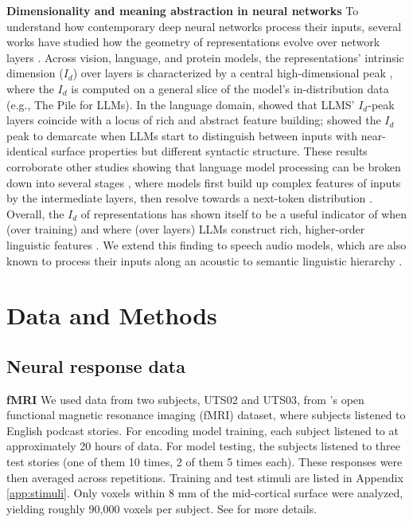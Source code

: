 \documentclass{article}
\theoremstyle{plain}
\theoremstyle{definition}
\theoremstyle{remark}
\newcommand{\mypar}[1]{\textbf{#1}\quad}
\begin{document}
\mypar{Dimensionality and meaning abstraction in neural networks} 
To understand how contemporary deep neural networks process their inputs, several works have studied how the geometry of representations evolve over network layers \citep{Ansuini_Laio_Macke_Zoccolan_2019,valeriani2023,Doimo_Serra_Ansuini_Cazzaniga_2024,lee2025shared}. Across vision, language, and protein models, the representations' intrinsic dimension ($I_d$) over layers is characterized by a central high-dimensional peak \citep{Ansuini_Laio_Macke_Zoccolan_2019,valeriani2023,cheng2025emergence}, where the $I_d$ is computed on a general slice of the model's in-distribution data (e.g., The Pile for LLMs). 
In the language domain, \citet{cheng2025emergence} showed that LLMS' $I_d$-peak layers coincide with a locus of rich and abstract feature building; \citet{baroni2026tracingcomplexityprofilesdifferent} showed the $I_d$ peak to demarcate when LLMs start to distinguish between inputs with near-identical surface properties but different syntactic structure. These results corroborate other studies showing that language model processing can be broken down into several stages \citep{tenney-etal-2019-bert}, where models first build up complex features of inputs by the intermediate layers, then resolve towards a next-token distribution \citep{skean2025layer,lad2025remarkable,acevedo2025quantitativeanalysissemanticinformation}. Overall, the $I_d$ of representations has shown itself to be a useful indicator of when (over training) and where (over layers) LLMs construct rich, higher-order linguistic features \citep{chen2024sudden,lee-etal-2025-geometric}. We extend this finding to speech audio models, which are also known to process their inputs along an acoustic to semantic linguistic hierarchy \citep{pasad2021layerwise,pasad2023comparativelayerwiseanalysisselfsupervised,he-etal-2025-layer}.

\section{Data and Methods}

\subsection{Neural response data} 
\mypar{fMRI}
We used data from two subjects, UTS02 and UTS03, from \citet{LeBel_Wagner_Jain_Adhikari-Desai_Gupta_Morgenthal_Tang_Xu_Huth_2023}'s open functional magnetic resonance imaging (fMRI) dataset, where subjects listened to English podcast stories.
For encoding model training, each subject listened to at approximately 20 hours of data. For model testing, the subjects listened to three test stories (one of them 10 times, 2 of them 5 times each). These responses were then averaged across repetitions. Training and test stimuli are listed in Appendix \ref{app:stimuli}. Only voxels within 8 mm of the mid-cortical surface were analyzed, yielding roughly 90,000 voxels per subject. See \citet{LeBel_Wagner_Jain_Adhikari-Desai_Gupta_Morgenthal_Tang_Xu_Huth_2023} for more details.
\end{document}
